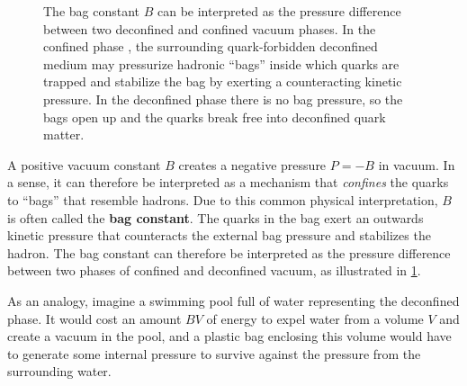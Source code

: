 \begin{figure}[t]
{
}
\caption{\label{fig:mit:bag_constant}%
	The bag constant $B$ can be interpreted as the pressure difference between two deconfined and confined vacuum phases.
	In the confined phase ,
	the surrounding quark-forbidden deconfined medium may pressurize hadronic ``bags''
	inside which quarks are trapped and stabilize the bag by exerting a counteracting kinetic pressure.
	In the deconfined phase  there is no bag pressure,
	so the bags open up and the quarks break free into deconfined quark matter.
}
\end{figure}


A positive vacuum constant $B$ creates a negative pressure $P = -B$ in vacuum.
In a sense, it can therefore be interpreted as a mechanism that \emph{confines} the quarks to ``bags'' that resemble hadrons.
Due to this common physical interpretation, $B$ is often called the \textbf{bag constant}.
The quarks in the bag exert an outwards kinetic pressure that counteracts the external bag pressure and stabilizes the hadron.
The bag constant can therefore be interpreted as the pressure difference between two phases of confined and deconfined vacuum,
as illustrated in \cref{fig:mit:bag_constant}.

As an analogy, imagine a swimming pool full of water representing the deconfined phase.
It would cost an amount $BV$ of energy to expel water from a volume $V$ and create a vacuum in the pool,
and a plastic bag enclosing this volume would have to generate some internal pressure to survive against the pressure from the surrounding water.

